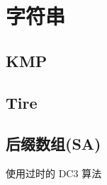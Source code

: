 %
%
	\newpage
	\section{字符串}
	\subsection{KMP}
	
	\newpage
	\subsection{Tire}
	
	\newpage
	\subsection{后缀数组(SA)}
	 使用过时的 DC3 算法\\
	
%	
%